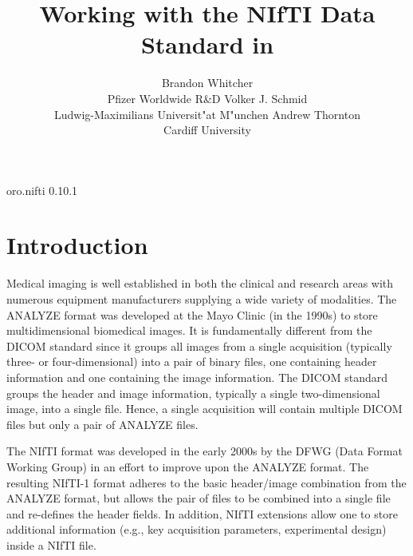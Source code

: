\documentclass[
]{article}
\author{
Brandon Whitcher\\Pfizer Worldwide R\&D \And Volker J. Schmid\\Ludwig-Maximilians Universit"at M"unchen \And Andrew Thornton\\Cardiff University
}
\title{Working with the NIfTI Data Standard in \proglang{R}}
\begin{document}
\begin{CodeChunk}

\begin{CodeOutput}
oro.nifti 0.10.1
\end{CodeOutput}
\end{CodeChunk}

\hypertarget{introduction}{%
\section{Introduction}\label{introduction}}

Medical imaging is well established in both the clinical and research
areas with numerous equipment manufacturers supplying a wide variety of
modalities. The ANALYZE format was developed at the Mayo Clinic (in the
1990s) to store multidimensional biomedical images. It is fundamentally
different from the DICOM standard since it groups all images from a
single acquisition (typically three- or four-dimensional) into a pair of
binary files, one containing header information and one containing the
image information. The DICOM standard groups the header and image
information, typically a single two-dimensional image, into a single
file. Hence, a single acquisition will contain multiple DICOM files but
only a pair of ANALYZE files.

The NIfTI format was developed in the early 2000s by the DFWG (Data
Format Working Group) in an effort to improve upon the ANALYZE format.
The resulting NIfTI-1 format adheres to the basic header/image
combination from the ANALYZE format, but allows the pair of files to be
combined into a single file and re-defines the header fields. In
addition, NIfTI extensions allow one to store additional information
(e.g., key acquisition parameters, experimental design) inside a NIfTI
file.
\end{document}
